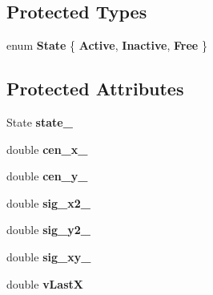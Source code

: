 \subsection*{Protected Types}
\begin{DoxyCompactItemize}
\item 
enum {\bfseries State} \{ {\bfseries Active}, 
{\bfseries Inactive}, 
{\bfseries Free}
 \}\hypertarget{classBlobTracker_a7e8d5dcd8736e3ae2a1c448a36e3516f}{}\label{classBlobTracker_a7e8d5dcd8736e3ae2a1c448a36e3516f}

\end{DoxyCompactItemize}
\subsection*{Protected Attributes}
\begin{DoxyCompactItemize}
\item 
State {\bfseries state\+\_\+}\hypertarget{classBlobTracker_ad96c96edcf8e9b2155aba3c39d128249}{}\label{classBlobTracker_ad96c96edcf8e9b2155aba3c39d128249}

\item 
double {\bfseries cen\+\_\+x\+\_\+}\hypertarget{classBlobTracker_a93b360b9499b9a77c7da2eb0b264d8af}{}\label{classBlobTracker_a93b360b9499b9a77c7da2eb0b264d8af}

\item 
double {\bfseries cen\+\_\+y\+\_\+}\hypertarget{classBlobTracker_ab5eaa89cfedfb25fc0881009cefdbea4}{}\label{classBlobTracker_ab5eaa89cfedfb25fc0881009cefdbea4}

\item 
double {\bfseries sig\+\_\+x2\+\_\+}\hypertarget{classBlobTracker_a90039cb4599ff8cf137d0b0a9b89801e}{}\label{classBlobTracker_a90039cb4599ff8cf137d0b0a9b89801e}

\item 
double {\bfseries sig\+\_\+y2\+\_\+}\hypertarget{classBlobTracker_a8fa7fa36db3faed93d94b30bd50449e1}{}\label{classBlobTracker_a8fa7fa36db3faed93d94b30bd50449e1}

\item 
double {\bfseries sig\+\_\+xy\+\_\+}\hypertarget{classBlobTracker_af7c64be12d9aeee877adc6027e57dc31}{}\label{classBlobTracker_af7c64be12d9aeee877adc6027e57dc31}

\item 
double {\bfseries v\+LastX}\hypertarget{classBlobTracker_a37789b44e5e478a237580a3e168bd496}{}\label{classBlobTracker_a37789b44e5e478a237580a3e168bd496}


\end{DoxyCompactItemize}
